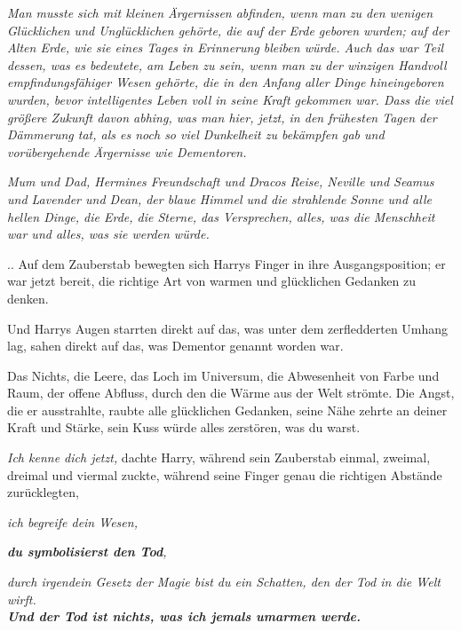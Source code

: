 {\hfill\break

\emph{Man musste sich mit kleinen Ärgernissen abfinden, wenn man zu den wenigen Glücklichen und Unglücklichen gehörte, die auf der Erde geboren wurden; auf der Alten Erde, wie sie eines Tages in Erinnerung bleiben würde. Auch das war Teil dessen, was es bedeutete, am Leben zu sein, wenn man zu der winzigen Handvoll empfindungsfähiger Wesen gehörte, die in den Anfang aller Dinge hineingeboren wurden, bevor intelligentes Leben voll in seine Kraft gekommen war. Dass die viel größere Zukunft davon abhing, was man hier, jetzt, in den frühesten Tagen der Dämmerung tat, als es noch so viel Dunkelheit zu bekämpfen gab und vorübergehende Ärgernisse wie Dementoren.}

\hfill\break

\emph{\hfill\break Mum und Dad, Hermines Freundschaft und Dracos Reise, Neville und Seamus und Lavender und Dean, der blaue Himmel und die strahlende Sonne und alle hellen Dinge, die Erde, die Sterne, das Versprechen, alles, was die Menschheit war und alles, was sie werden würde.}

.. Auf dem Zauberstab bewegten sich Harrys Finger in ihre Ausgangsposition; er war jetzt bereit, die richtige Art von warmen und glücklichen Gedanken zu denken.

Und Harrys Augen starrten direkt auf das, was unter dem zerfledderten Umhang lag, sahen direkt auf das, was Dementor genannt worden war.

Das Nichts, die Leere, das Loch im Universum, die Abwesenheit von Farbe und Raum, der offene Abfluss, durch den die Wärme aus der Welt strömte. Die Angst, die er ausstrahlte, raubte alle glücklichen Gedanken, seine Nähe zehrte an deiner Kraft und Stärke, sein Kuss würde alles zerstören, was du warst.

\emph{Ich kenne dich jetzt,} dachte Harry, während sein Zauberstab einmal, zweimal, dreimal und viermal zuckte, während seine Finger genau die richtigen Abstände zurücklegten,

\emph{ich begreife dein Wesen,}

\hfill\break

\textbf{\emph{du symbolisierst den Tod}}\emph{,}

\hfill\break

\emph{durch irgendein Gesetz der Magie bist du ein Schatten, den der Tod in die Welt wirft.}\\ \textbf{\emph{Und der Tod ist nichts, was ich jemals umarmen werde.}}

\hfill\break

}
